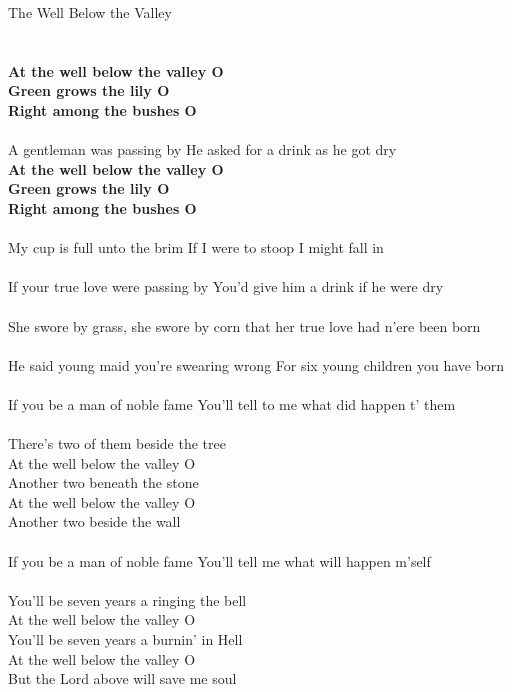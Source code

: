 \documentclass[letterpaper,9pt]{article}
\begin{document}
\newpage
{}
\huge
The Well Below the Valley\\
\\
\Large
\\\textbf{At the well below the valley O
\\Green grows the lily O
\\Right among the bushes O}
\\
\\A gentleman was passing by He asked for a drink as he got dry
\\\textbf{At the well below the valley O
\\Green grows the lily O
\\Right among the bushes O}
\\
\\My cup is full unto the brim If I were to stoop I might fall in
\\
\\If your true love were passing by You'd give him a drink if he were dry
\\
\\She swore by grass, she swore by corn that her true love had n'ere been born
\\
\\He said young maid you're swearing wrong For six young children you have born
\\
\\If you be a man of noble fame You'll tell to me what did happen t' them
\\
\\There's two of them beside the tree
\\At the well below the valley O
\\Another two beneath the stone
\\At the well below the valley O
\\Another two beside the wall
\\
\\If you be a man of noble fame You'll tell me what will happen m'self
\\
\\You'll be seven years a ringing the bell
\\At the well below the valley O
\\You'll be seven years a burnin' in Hell
\\At the well below the valley O
\\But the Lord above will save me soul
\end{document}
